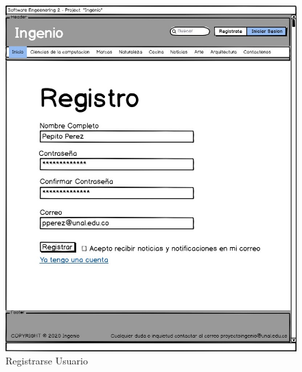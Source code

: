 \documentclass[a4paper,12 pt]{article}
\begin{document}
\begin{figure}[H]
    \centering
    \includegraphics[scale = 1]{images/RegistrarseUsuario.jpg}
    \caption{Registrarse Usuario}
    \label{F102}
\end{figure}{}
\end{document}
